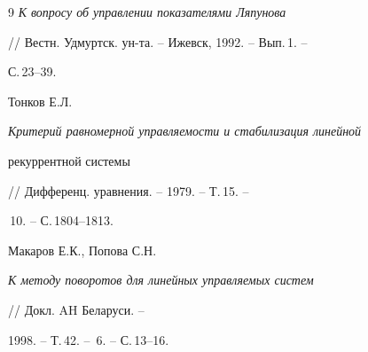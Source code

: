 \begin{thebibliography}{9}
{\em К вопросу об управлении показателями Ляпунова}


// Вестн. Удмуртск. ун-та. -- Ижевск, 1992. -- Вып.\,1. --


С.\,23--39.




Тонков Е.Л.


{\em Критерий равномерной управляемости и стабилизация линейной


рекуррентной системы}


// Дифференц. уравнения. -- 1979. -- Т.\,15. --


\No\,10. -- С.\,1804--1813.




Макаров Е.К., Попова С.Н.


{\em К методу поворотов для линейных управляемых систем}


// Докл. AH Беларуси. --


1998. -- Т.\,42. -- \No\,6. -- С.\,13--16.





\end{thebibliography}





\vskip 2cm












\label{end}





